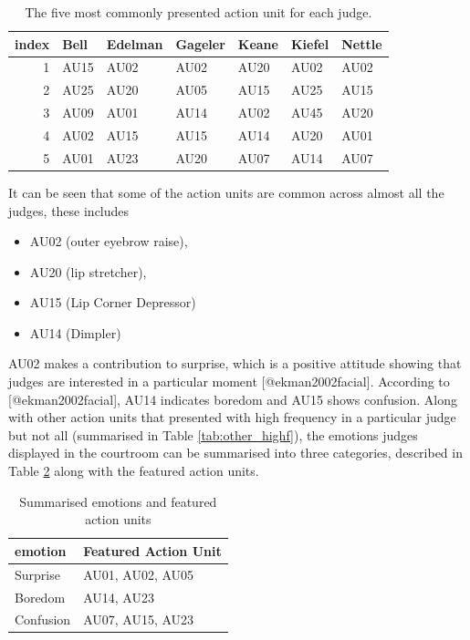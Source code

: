 \documentclass{monashthesis}
\begin{document}
\begin{table}[t]

\caption{\label{tab:unnamed-chunk-5}\label{tab:most_common}The five most commonly presented action unit for each judge.}
\centering
\begin{tabular}{r|l|l|l|l|l|l}
\hline
index & Bell & Edelman & Gageler & Keane & Kiefel & Nettle\\
\hline
1 & AU15 & AU02 & AU02 & AU20 & AU02 & AU02\\
\hline
2 & AU25 & AU20 & AU05 & AU15 & AU25 & AU15\\
\hline
3 & AU09 & AU01 & AU14 & AU02 & AU45 & AU20\\
\hline
4 & AU02 & AU15 & AU15 & AU14 & AU20 & AU01\\
\hline
5 & AU01 & AU23 & AU20 & AU07 & AU14 & AU07\\
\hline
\end{tabular}
\end{table}

It can be seen that some of the action units are common across almost all the judges, these includes

\begin{itemize}
\tightlist
\item
  AU02 (outer eyebrow raise),
\item
  AU20 (lip stretcher),
\item
  AU15 (Lip Corner Depressor)
\item
  AU14 (Dimpler)
\end{itemize}

AU02 makes a contribution to surprise, which is a positive attitude showing that judges are interested in a particular moment {[}@ekman2002facial{]}. According to {[}@ekman2002facial{]}, AU14 indicates boredom and AU15 shows confusion. Along with other action units that presented with high frequency in a particular judge but not all (summarised in Table \ref{tab:other_highf}), the emotions judges displayed in the courtroom can be summarised into three categories, described in Table \ref{tab:three_category} along with the featured action units.

\begin{table}[t]

\caption{\label{tab:unnamed-chunk-6}\label{tab:three_category} Summarised emotions and featured action units}
\centering
\begin{tabular}{l|l}
\hline
emotion & Featured Action Unit\\
\hline
Surprise & AU01, AU02, AU05\\
\hline
Boredom & AU14, AU23\\
\hline
Confusion & AU07, AU15, AU23\\
\hline
\end{tabular}
\end{table}
\end{document}
